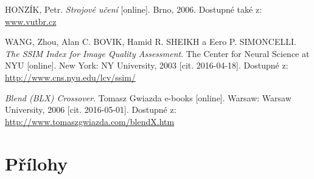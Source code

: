 \documentclass[a4paper,11pt]{scrartcl}
\begin{document}
\begin{thebibliography}{9}
 
HONZÍK, Petr. \emph{Strojové učení} [online]. Brno, 2006. Dostupné také z: \url{www.vutbr.cz}

WANG, Zhou, Alan C. BOVIK, Hamid R. SHEIKH a Eero P. SIMONCELLI. \emph{The SSIM Index for Image Quality Assessment}. The Center for Neural Science at NYU [online]. New York: NY University, 2003 [cit. 2016-04-18]. Dostupné z: \url{http://www.cns.nyu.edu/lcv/ssim/}

\emph{Blend (BLX) Crossover}. Tomasz Gwiazda e-books [online]. Warsaw: Warsaw University, 2006 [cit. 2016-05-01]. Dostupné z: \url{http://www.tomaszgwiazda.com/blendX.htm}

\end{thebibliography}

\newpage
\section{Přílohy}

\end{document}

